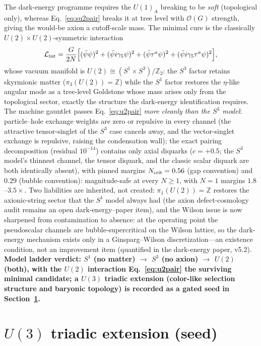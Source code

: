 \documentclass[11pt,a4paper]{article}
\begin{document}
The dark-energy programme requires the $U(1)_A$ breaking to be
\emph{soft} (topological only), whereas Eq.~\eqref{eq:su2pair}
breaks it at tree level with $\mathcal{O}(G)$ strength, giving
the would-be axion a cutoff-scale mass.  The minimal cure is the
classically $U(2)\times U(2)$-symmetric interaction
\begin{equation}
\mathcal{L}_{\rm int} = \frac{G}{2N}\Bigl[(\bar\psi\psi)^2
+ (\bar\psi i\gamma_5\psi)^2
+ (\bar\psi\tau^a\psi)^2
+ (\bar\psi i\gamma_5\tau^a\psi)^2\Bigr],
\label{eq:u2pair}
\end{equation}
whose vacuum manifold is $U(2) \cong (S^1\times S^3)/\mathbb{Z}_2$:
the $S^3$ factor retains skyrmionic matter
($\pi_3(U(2)) = \mathbb{Z}$) while the $S^1$ factor restores the
$\eta$-like angular mode as a tree-level Goldstone whose mass
arises only from the topological sector, exactly the structure the
dark-energy identification requires.
The machine gauntlet passes Eq.~\eqref{eq:u2pair} \emph{more
cleanly than the $S^3$ model}: particle--hole exchange weights are
zero or repulsive in every channel (the attractive tensor-singlet
of the $S^3$ case cancels away, and the vector-singlet exchange is
repulsive, raising the condensation wall); the exact pairing
decomposition (residual $10^{-14}$) contains only axial diquarks
($c = +0.5$; the $S^3$ model's thinnest channel, the tensor
diquark, and the classic scalar diquark are both identically
absent), with pinned margins $N_{\rm crit} = 0.56$ (gap
convention) and $0.29$ (bubble convention): magnitude-safe at
every $N \geq 1$, with $N=1$ margins $1.8$--$3.5\times$.
Two liabilities are inherited, not created: $\pi_1(U(2)) =
\mathbb{Z}$ restores the axionic-string sector that the $S^1$
model always had (the axion defect-cosmology audit remains an
open dark-energy--paper item), and the Wilson issue is now sharpened from contamination to
absence: at the operating point the pseudoscalar channels are
bubble-supercritical on the Wilson lattice, so the dark-energy
mechanism exists only in a Ginsparg--Wilson discretization---an
existence condition, not an improvement item (quantified in the
dark-energy paper, v5.2).
\textbf{Model ladder verdict: $S^1$ (no matter) $\to$ $S^3$ (no
axion) $\to$ $U(2)$ (both), with the $U(2)$ interaction
Eq.~\eqref{eq:u2pair} the surviving minimal candidate; a $U(3)$
triadic extension (color-like selection structure and baryonic
topology) is recorded as a gated seed in
Section~\ref{sec:u3seed}.}


\section{$U(3)$ triadic extension (seed)}
\label{sec:u3seed}
\end{document}
